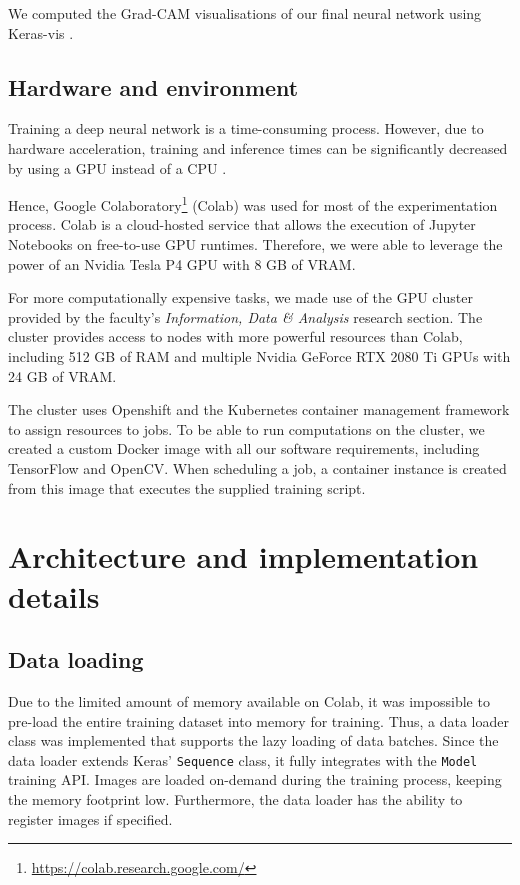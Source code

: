 \documentclass{l4proj}
\begin{document}
We computed the Grad-CAM visualisations of our final neural network using Keras-vis \citep{kotikalapudi_keras-vis_2017}.

\subsection{Hardware and environment}

Training a deep neural network is a time-consuming process. However, due to hardware acceleration, training and inference times can be significantly decreased by using a GPU instead of a CPU \citep{shi_benchmarking_2016}. 

Hence, Google Colaboratory\footnote{\url{https://colab.research.google.com/}} (Colab) was used for most of the experimentation process. Colab is a cloud-hosted service that allows the execution of Jupyter Notebooks on free-to-use GPU runtimes. Therefore, we were able to leverage the power of an Nvidia Tesla P4 GPU with 8 GB of VRAM.

For more computationally expensive tasks, we made use of the GPU cluster provided by the faculty's \textit{Information, Data \& Analysis} research section. The cluster provides access to nodes with more powerful resources than Colab, including 512 GB of RAM and multiple Nvidia GeForce RTX 2080 Ti GPUs with 24 GB of VRAM.

The cluster uses Openshift and the Kubernetes container management framework to assign resources to jobs. To be able to run computations on the cluster, we created a custom Docker image with all our software requirements, including TensorFlow and OpenCV. When scheduling a job, a container instance is created from this image that executes the supplied training script.


\section{Architecture and implementation details}

\subsection{Data loading}

Due to the limited amount of memory available on Colab, it was impossible to pre-load the entire training dataset into memory for training. Thus, a data loader class was implemented that supports the lazy loading of data batches. Since the data loader extends Keras' \lstinline{Sequence} class, it fully integrates with the \lstinline{Model} training API. Images are loaded on-demand during the training process, keeping the memory footprint low. Furthermore, the data loader has the ability to register images if specified.
\end{document}

